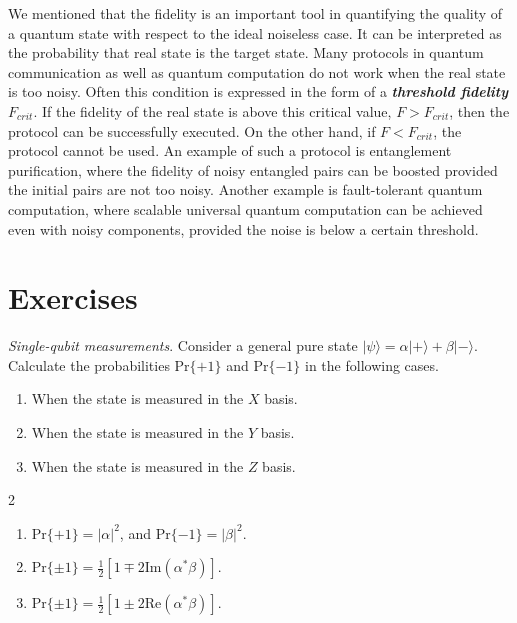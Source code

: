 We mentioned that the fidelity is an important tool in quantifying the quality of a quantum state with respect to the ideal noiseless case.
It can be interpreted as the probability that real state is the target state.
Many protocols in quantum communication as well as quantum computation do not work when the real state is too noisy.
Often this condition is expressed in the form of a \textbf{\emph{threshold fidelity}} $F_{crit}$.
If the fidelity of the real state is above this critical value, $F > F_{crit}$, then the protocol can be successfully executed.
On the other hand, if $F < F_{crit}$, the protocol cannot be used.
An example of such a protocol is entanglement purification, where the fidelity of noisy entangled pairs can be boosted provided the initial pairs are not too noisy.
Another example is fault-tolerant quantum computation, where scalable universal quantum computation can be achieved even with noisy components, provided the noise is below a certain threshold.


\newpage

\section{Exercises}

\begin{exercise}
\emph{Single-qubit measurements}.
Consider a general pure state $|\psi\rangle=\alpha|+\rangle+\beta|-\rangle$. Calculate the probabilities $\text{Pr}\{+1\}$ and $\text{Pr}\{-1\}$ in the following cases.
\begin{enumerate}[label=(\alph*)]
    \item When the state is measured in the $X$ basis.
    \item When the state is measured in the $Y$ basis.
    \item When the state is measured in the $Z$ basis.
\end{enumerate}
\end{exercise}
\begin{solution}
\begin{multicols}{2}
    \begin{enumerate}[label=(\alph*)]
        \item $\text{Pr}\{+1\}=|\alpha|^2$, and $\text{Pr}\{-1\}=|\beta|^2$.
        \item $\text{Pr}\{\pm1\}=\frac{1}{2}[1 \mp 2\text{Im}(\alpha^*\beta)]$.
        \item $\text{Pr}\{\pm1\}=\frac{1}{2}[1 \pm 2\text{Re}(\alpha^*\beta)]$.
    \end{enumerate}
\end{multicols}
\end{solution}

